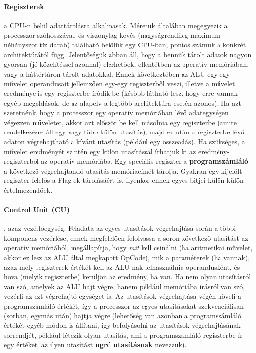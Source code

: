   \paragraph{Regiszterek} a CPU-n belül adattárolásra alkalmasak. Méretük általában megegyezik a processzor szóhosszával, és viszonylag kevés (nagyságrendileg maximum néhányszor tíz darab) található belőlük egy CPU-ban, pontos számuk a konkrét architektúrától függ. Jelentőségük abban áll, hogy a bennük tárolt adatok nagyon gyorsan (jó közelítéssel azonnal) elérhetőek, ellentétben az operatív memóriában, vagy a háttértáron tárolt adatokkal. Ennek következtében az ALU egy-egy művelet operandusait jellemzően egy-egy regiszterből veszi, illetve a művelet eredménye is egy regiszterbe íródik be (később látható lesz, hogy erre vannak egyéb megoldások, de az alapelv a legtöbb architektúra esetén azonos). Ha azt szeretnénk, hogy a processzor egy operatív memóriában lévő adategységen végezzen műveletet, akkor azt először be kell másolnia egy regiszterbe (amire rendelkezésre áll egy vagy több külön utasítás), majd ez után a regiszterbe lévő adaton végrehajtható a kívánt utasítás (például egy összeadás). Ha szükséges, a művelet eredményét szintén egy külön utasítással írhatjuk ki az eredmény-regiszterből az operatív memóriába. Egy speciális regiszter a \textbf{programszámláló} a következő végrehajtandó utasítás memóriacímét tárolja. Gyakran egy kijelölt regiszter felelős a Flag-ek tárolásáért is, ilyenkor ennek egyes bitjei külön-külön értelmezendőek. 
  \paragraph{Control Unit (CU)}, azaz vezérlőegység. Feladata az egyes utasítások végrehajtása során a többi komponens vezérlése, ennek megfelelően felolvassa a soron következő utasítást az operatív memóriából, megállapítja, hogy \emph{mit} kell csinálni (ha aritmetikai művelet, akkor ez lesz az ALU által megkapott OpCode), mik a paraméterek (ha vannak), azaz mely regiszterek értékét kell az ALU-nak felhasználnia operandusként, és hova (melyik regiszterbe) kerüljön az eredmény, ha van. Ha nem olyan utasításról van szó, amelyek az ALU hajt végre, hanem például memóriába írásról van szó, vezérli az ezt végrehajtó egységet is. Az utasítások végrehajtása végén növeli a programszámláló értékét, így a processzor az egyes utasításokat szekvenciálisan (sorban, egymás után) hajtja végre (lehetőség van azonban a programszámláló értékét egyéb módon is állítani, így befolyásolni az utasítások végrehajtásának sorrendjét, például létezik olyan utasítás, ami a programszámláló-regiszterbe ír egy értéket, az ilyen utasítást \textbf{ugró utasításnak} nevezzük).

